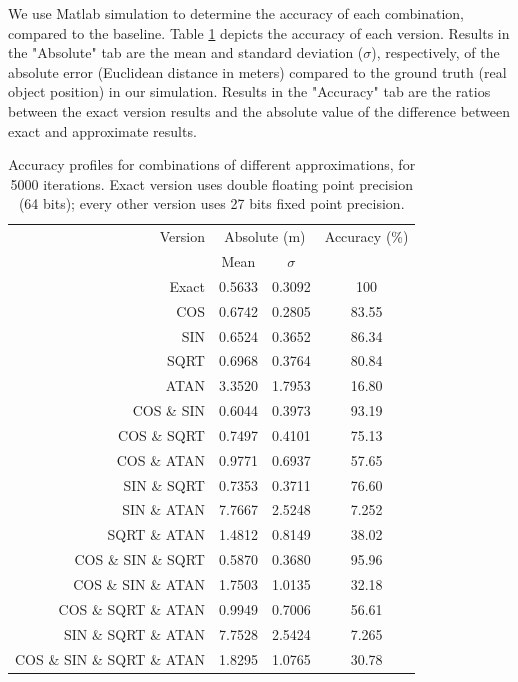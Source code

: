 \par We use Matlab simulation to determine the accuracy of each combination, compared to the baseline. Table \ref{table:acc_profiles} depicts the accuracy of each version. Results in the "Absolute" tab are the mean and standard deviation ($\sigma$), respectively, of the absolute error (Euclidean distance in meters) compared to the ground truth (real object position) in our simulation. Results in the "Accuracy" tab are the ratios between the exact version results and the absolute value of the difference between exact and approximate results.
    


\begin{table}[h]
\begin{tabular}{r c c c}
\toprule
Version & \multicolumn{2}{c}{Absolute (m)} & Accuracy (\%)\\
 & Mean & $\sigma$ & \\
\hline
Exact	& 0.5633 & 0.3092 & 100\\
\hline
COS & 						0.6742	& 0.2805	& 83.55 \\
SIN & 						0.6524	& 0.3652	& 86.34 \\
SQRT & 						0.6968	& 0.3764	& 80.84 \\
ATAN & 						3.3520	& 1.7953	& 16.80 \\
COS \& SIN & 				0.6044	& 0.3973	& 93.19 \\
COS \& SQRT& 				0.7497	& 0.4101	& 75.13 \\
COS \& ATAN & 				0.9771	& 0.6937	& 57.65 \\
SIN \& SQRT & 				0.7353	& 0.3711	& 76.60 \\
SIN \& ATAN & 				7.7667	& 2.5248	& 7.252 \\
SQRT \& ATAN & 				1.4812	& 0.8149	& 38.02 \\
COS \& SIN \& SQRT & 		0.5870	& 0.3680	& 95.96 \\
COS \& SIN \& ATAN& 		1.7503	& 1.0135	& 32.18 \\
COS \& SQRT \& ATAN& 		0.9949	& 0.7006	& 56.61 \\
SIN \& SQRT \& ATAN  & 		7.7528	& 2.5424	& 7.265 \\
COS \& SIN \& SQRT \& ATAN &1.8295 	& 1.0765	& 30.78 \\
\hline
\end{tabular}
\caption{Accuracy profiles for combinations of different approximations, for 5000 iterations. Exact version uses double floating point precision (64 bits); every other version uses 27 bits fixed point precision.}
\label{table:acc_profiles}
\end{table}

